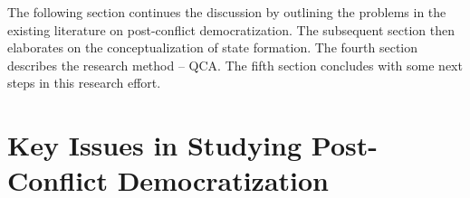 \documentclass [11pt]{article}
\begin{document}

The following section continues the discussion by outlining the problems in the existing literature on post-conflict democratization. The subsequent section then elaborates on the conceptualization of state formation. The fourth section describes the research method -- QCA. The fifth section concludes with some next steps in this research effort.


\section*{Key Issues in Studying Post-Conflict Democratization}


\end{document}
